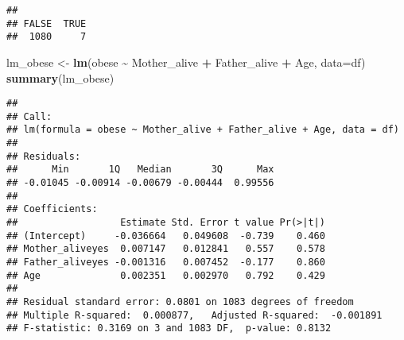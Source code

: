 \documentclass[
]{article}
\newenvironment{Shaded}{\begin{snugshade}}{\end{snugshade}}
\newcommand{\AttributeTok}[1]{\textcolor[rgb]{0.13,0.29,0.53}{#1}}
\newcommand{\CommentTok}[1]{\textcolor[rgb]{0.56,0.35,0.01}{\textit{#1}}}
\newcommand{\DecValTok}[1]{\textcolor[rgb]{0.00,0.00,0.81}{#1}}
\newcommand{\FunctionTok}[1]{\textcolor[rgb]{0.13,0.29,0.53}{\textbf{#1}}}
\newcommand{\NormalTok}[1]{#1}
\newcommand{\OtherTok}[1]{\textcolor[rgb]{0.56,0.35,0.01}{#1}}
\newcommand{\SpecialCharTok}[1]{\textcolor[rgb]{0.81,0.36,0.00}{\textbf{#1}}}
\newcommand{\StringTok}[1]{\textcolor[rgb]{0.31,0.60,0.02}{#1}}
\begin{document}
\begin{Shaded}
\end{Shaded}

\begin{verbatim}
## 
## FALSE  TRUE 
##  1080     7
\end{verbatim}

\begin{Shaded}
\begin{Highlighting}[]
\NormalTok{lm\_obese }\OtherTok{\textless{}{-}} \FunctionTok{lm}\NormalTok{(obese }\SpecialCharTok{\textasciitilde{}}\NormalTok{ Mother\_alive }\SpecialCharTok{+}\NormalTok{ Father\_alive }\SpecialCharTok{+}\NormalTok{ Age, }\AttributeTok{data=}\NormalTok{df)}
\FunctionTok{summary}\NormalTok{(lm\_obese)}
\end{Highlighting}
\end{Shaded}

\begin{verbatim}
## 
## Call:
## lm(formula = obese ~ Mother_alive + Father_alive + Age, data = df)
## 
## Residuals:
##      Min       1Q   Median       3Q      Max 
## -0.01045 -0.00914 -0.00679 -0.00444  0.99556 
## 
## Coefficients:
##                  Estimate Std. Error t value Pr(>|t|)
## (Intercept)     -0.036664   0.049608  -0.739    0.460
## Mother_aliveyes  0.007147   0.012841   0.557    0.578
## Father_aliveyes -0.001316   0.007452  -0.177    0.860
## Age              0.002351   0.002970   0.792    0.429
## 
## Residual standard error: 0.0801 on 1083 degrees of freedom
## Multiple R-squared:  0.000877,   Adjusted R-squared:  -0.001891 
## F-statistic: 0.3169 on 3 and 1083 DF,  p-value: 0.8132
\end{verbatim}
\end{document}
